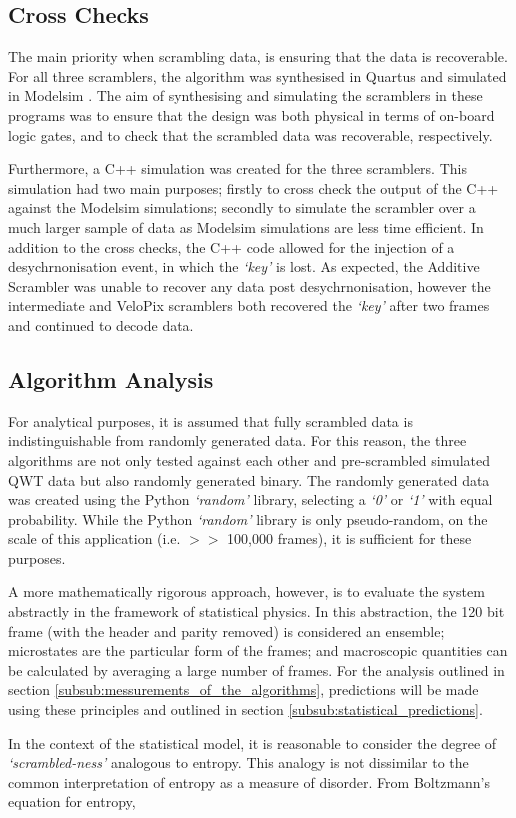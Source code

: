 	\subsection{Cross Checks} %
	\label{sub:cross_checks}
		The main priority when scrambling data, is ensuring that the data is recoverable.
		For all three scramblers, the algorithm was synthesised in Quartus \cite{ref:quartus} and simulated in Modelsim \cite{ref:modelsim}.
		The aim of synthesising and simulating the scramblers in these programs was to ensure that the design was both physical in terms of on-board logic gates, and to check that the scrambled data was recoverable, respectively.
		\par
		Furthermore, a C++ simulation was created for the three scramblers.
		This simulation had two main purposes;
		firstly to cross check the output of the C++ against the Modelsim simulations;
		secondly to simulate the scrambler over a much larger sample of data as Modelsim simulations are less time efficient.
		In addition to the cross checks, the C++ code allowed for the injection of a desychrnonisation event, in which the \textit{`key'} is lost.
		As expected, the Additive Scrambler was unable to recover any data post desychrnonisation, however the intermediate and VeloPix scramblers both recovered the \textit{`key'} after two frames and continued to decode data.


	\subsection{Algorithm Analysis}
	\label{sub:algorithm_analysis}

		For analytical purposes, it is assumed that fully scrambled data is indistinguishable from randomly generated data. 
		For this reason, the three algorithms are not only tested against each other and pre-scrambled simulated QWT data but also randomly generated binary.
		The randomly generated data was created using the Python \textit{`random'} library, selecting a \textit{`0'} or \textit{`1'} with equal probability.
		While the Python \textit{`random'} library is only pseudo-random, on the scale of this application (i.e. $>>$ 100,000 frames), it is sufficient for these purposes.
		\par
		A more mathematically rigorous approach, however, is to evaluate the system abstractly in the framework of statistical physics.
		In this abstraction, the 120 bit frame (with the header and parity removed)  is considered an ensemble; 
		microstates are the particular form of the frames;
		and macroscopic quantities can be calculated by averaging a large number of frames.
		For the analysis outlined in section \ref{subsub:messurements_of_the_algorithms}, predictions will be made using these principles and outlined in section \ref{subsub:statistical_predictions}.
		\par
		In the context of the statistical model, it is reasonable to consider the degree of \textit{`scrambled-ness'} analogous to entropy.	
		This analogy is not dissimilar to the common interpretation of entropy as a measure of disorder. 
		From Boltzmann's equation for entropy,

